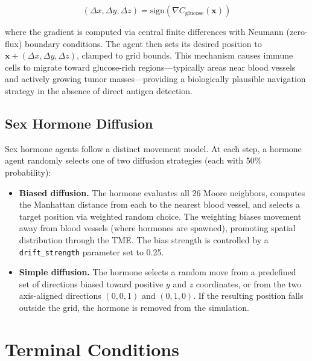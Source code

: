 \begin{equation}
    (\Delta x, \Delta y, \Delta z) = \text{sign}\left(\nabla C_{\text{glucose}}(\mathbf{x})\right)
    \label{eq:chemotaxis_step}
\end{equation}

\noindent where the gradient is computed via central finite differences with Neumann (zero-flux) boundary conditions. The agent then sets its desired position to $\mathbf{x} + (\Delta x, \Delta y, \Delta z)$, clamped to grid bounds. This mechanism causes immune cells to migrate toward glucose-rich regions---typically areas near blood vessels and actively growing tumor masses---providing a biologically plausible navigation strategy in the absence of direct antigen detection.

\subsection{Sex Hormone Diffusion}
\label{subsec:md_hormone_diffusion}

Sex hormone agents follow a distinct movement model. At each step, a hormone agent randomly selects one of two diffusion strategies (each with 50\% probability):

\begin{itemize}
    \item \textbf{Biased diffusion.} The hormone evaluates all 26 Moore neighbors, computes the Manhattan distance from each to the nearest blood vessel, and selects a target position via weighted random choice. The weighting biases movement away from blood vessels (where hormones are spawned), promoting spatial distribution through the TME. The bias strength is controlled by a \texttt{drift\_strength} parameter set to 0.25.
    \item \textbf{Simple diffusion.} The hormone selects a random move from a predefined set of directions biased toward positive $y$ and $z$ coordinates, or from the two axis-aligned directions $(0,0,1)$ and $(0,1,0)$. If the resulting position falls outside the grid, the hormone is removed from the simulation.
\end{itemize}

\section{Terminal Conditions}
\label{sec:md_terminal}


